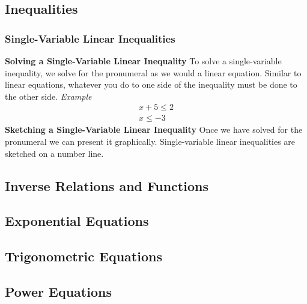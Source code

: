 \documentclass{article}
\begin{document}
		\subsection{Inequalities}
			\subsubsection{Single-Variable Linear Inequalities}
				\textbf{Solving a Single-Variable Linear Inequality}\newline
				To solve a single-variable inequality, we solve for the pronumeral as we would a linear equation. Similar to linear equations, whatever you do to one side of the inequality must be done to the other side.\newline\newline
				\textit{Example}
				\begin{align*}
					x+5\le2 \\
					x \le -3
				\end{align*}
				\textbf{Sketching a Single-Variable Linear Inequality}\newline
				Once we have solved for the pronumeral we can present it graphically. Single-variable linear inequalities are sketched on a number line.
				\begin{center}
				\end{center}
		\subsection{Inverse Relations and Functions}
		\subsection{Exponential Equations}
		\subsection{Trigonometric Equations}
		\subsection{Power Equations}
\end{document}
